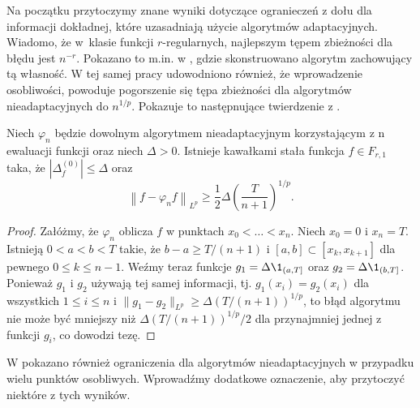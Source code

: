 \documentclass[oik, pdftex, robocza, man]{mgrwms}
\begin{document}
    Na początku przytoczymy znane wyniki dotyczące ogranieczeń z dołu dla informacji dokładnej, które uzasadniają użycie algorytmów adaptacyjnych. Wiadomo, że w~klasie funkcji $r$-regularnych, najlepszym tępem zbieżności dla błędu jest $n^{-r}$. Pokazano to m.in. w \cite{PoA}, gdzie skonstruowano algorytm zachowujący tą własność. W tej samej pracy udowodniono również, że wprowadzenie osobliwości, powoduje pogorszenie się tępa zbieżności dla algorytmów nieadaptacyjnych do $n^{1/p}$. Pokazuje to następnujące twierdzenie z \cite{PoA}.

    \begin{thm}
        Niech $\varphi_{n}$ będzie dowolnym algorytmem nieadaptacyjnym korzystającym z n ewaluacji funkcji oraz niech $\Delta > 0$. Istnieje kawałkami stała funkcja $f \in F_{r, 1}$ taka, że $|\Delta_{f}^{(0)}| \leq \Delta$ oraz
        \begin{equation*}
            \left\| f - \varphi_{n}f \right\|_{L^{p}} \geq \frac{1}{2}\Delta \left( \frac{T}{n+1} \right)^{1/p}.
        \end{equation*}
    \end{thm}
    \begin{proof}
        Załóżmy, że $\varphi_{n}$ oblicza $f$ w punktach $x_{0} < \ldots < x_{n}$. Niech $x_{0} = 0$ i $x_{n} = T$. Istnieją $0 < a < b < T$ takie, że $b-a \geq T/(n+1)$ i $[a,b] \subset [x_{k}, x_{k+1}]$ dla pewnego $0 \leq k \leq n-1$. Weźmy teraz funkcje $g_{1} = \Delta\1_{(a, T]}$ oraz $g_{2} = \Delta\1_{(b, T]}$. Ponieważ $g_{1}$ i $g_{2}$ używają tej samej informacji, tj. $g_{1}(x_{i}) = g_{2}(x_{i})$ dla wszystkich $1 \leq i \leq n$ i $\| g_{1} - g_{2} \|_{L^{p}} \geq \Delta(T / (n+1))^{1/p}$, to błąd algorytmu nie może być mniejszy niż $\Delta(T/(n+1))^{1/p} / 2$ dla przynajmniej jednej z funkcji $g_{i}$, co dowodzi tezę.
    \end{proof}

    W \cite{PoA} pokazano również ograniczenia dla algorytmów nieadaptacyjnych w przypadku wielu punktów osobliwych. Wprowadźmy dodatkowe oznaczenie, aby przytoczyć niektóre z tych wyników.
    
\end{document}
